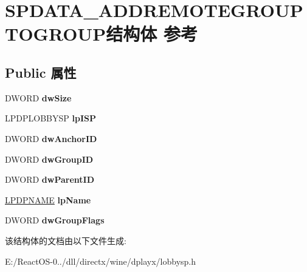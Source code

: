 \hypertarget{struct_s_p_d_a_t_a___a_d_d_r_e_m_o_t_e_g_r_o_u_p_t_o_g_r_o_u_p}{}\section{S\+P\+D\+A\+T\+A\+\_\+\+A\+D\+D\+R\+E\+M\+O\+T\+E\+G\+R\+O\+U\+P\+T\+O\+G\+R\+O\+U\+P结构体 参考}
\label{struct_s_p_d_a_t_a___a_d_d_r_e_m_o_t_e_g_r_o_u_p_t_o_g_r_o_u_p}
\subsection*{Public 属性}
\begin{DoxyCompactItemize}
\item 
\mbox{\label{struct_s_p_d_a_t_a___a_d_d_r_e_m_o_t_e_g_r_o_u_p_t_o_g_r_o_u_p_aff00f5368a19be8556b5a3b28b766545}} 
D\+W\+O\+RD {\bfseries dw\+Size}
\item 
\mbox{\label{struct_s_p_d_a_t_a___a_d_d_r_e_m_o_t_e_g_r_o_u_p_t_o_g_r_o_u_p_abdada7676a1ab8a5b65a548f5a92a3db}} 
L\+P\+D\+P\+L\+O\+B\+B\+Y\+SP {\bfseries lp\+I\+SP}
\item 
\mbox{\label{struct_s_p_d_a_t_a___a_d_d_r_e_m_o_t_e_g_r_o_u_p_t_o_g_r_o_u_p_aaaf9a23fce489aa1441cb454a4c19127}} 
D\+W\+O\+RD {\bfseries dw\+Anchor\+ID}
\item 
\mbox{\label{struct_s_p_d_a_t_a___a_d_d_r_e_m_o_t_e_g_r_o_u_p_t_o_g_r_o_u_p_ad6c6d4a5a4913c7cc10a753e43728faf}} 
D\+W\+O\+RD {\bfseries dw\+Group\+ID}
\item 
\mbox{\label{struct_s_p_d_a_t_a___a_d_d_r_e_m_o_t_e_g_r_o_u_p_t_o_g_r_o_u_p_afa4dc381be0843a12f3f848ea707eb31}} 
D\+W\+O\+RD {\bfseries dw\+Parent\+ID}
\item 
\mbox{\label{struct_s_p_d_a_t_a___a_d_d_r_e_m_o_t_e_g_r_o_u_p_t_o_g_r_o_u_p_a47c9c7a36b8ee9697027cf941a12c740}} 
\hyperlink{structtag_d_p_n_a_m_e}{L\+P\+D\+P\+N\+A\+ME} {\bfseries lp\+Name}
\item 
\mbox{\label{struct_s_p_d_a_t_a___a_d_d_r_e_m_o_t_e_g_r_o_u_p_t_o_g_r_o_u_p_ae6b6d653fbe46e56234447e984dac45f}} 
D\+W\+O\+RD {\bfseries dw\+Group\+Flags}
\end{DoxyCompactItemize}


该结构体的文档由以下文件生成\+:\begin{DoxyCompactItemize}
\item 
E\+:/\+React\+O\+S-\/0../dll/directx/wine/dplayx/lobbysp.\+h\end{DoxyCompactItemize}
